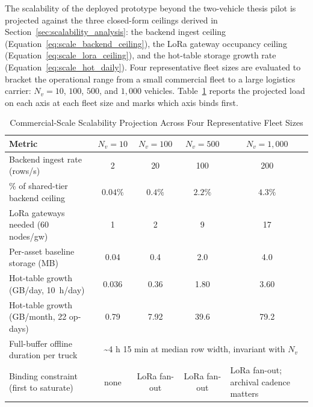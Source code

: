 The scalability of the deployed prototype beyond the two-vehicle thesis pilot is projected against the three closed-form ceilings derived in Section~\ref{sec:scalability_analysis}: the backend ingest ceiling (Equation~\ref{eq:scale_backend_ceiling}), the LoRa gateway occupancy ceiling (Equation~\ref{eq:scale_lora_ceiling}), and the hot-table storage growth rate (Equation~\ref{eq:scale_hot_daily}). Four representative fleet sizes are evaluated to bracket the operational range from a small commercial fleet to a large logistics carrier: $N_v = 10$, $100$, $500$, and $1{,}000$ vehicles. Table~\ref{tab:commercial_scalability} reports the projected load on each axis at each fleet size and marks which axis binds first.

\begin{table}[!htbp]
\centering
\caption{Commercial-Scale Scalability Projection Across Four Representative Fleet Sizes}
\label{tab:commercial_scalability}
\scriptsize
\setlength{\tabcolsep}{3pt}
\renewcommand{\arraystretch}{1.15}
\begin{tabular}{|p{}|c|c|c|p{}|}
\hline
\textbf{Metric} & \textbf{$N_v = 10$} & \textbf{$N_v = 100$} & \textbf{$N_v = 500$} & \multicolumn{1}{c|}{\textbf{$N_v = 1{,}000$}} \\
\hline
Backend ingest rate (rows/s) & 2 & 20 & 100 & \multicolumn{1}{c|}{200} \\
\hline
\% of shared-tier backend ceiling & $0.04\%$ & $0.4\%$ & $2.2\%$ & \multicolumn{1}{c|}{$4.3\%$} \\
\hline
LoRa gateways needed (60 nodes/gw) & 1 & 2 & 9 & \multicolumn{1}{c|}{17} \\
\hline
Per-asset baseline storage (MB) & 0.04 & 0.4 & 2.0 & \multicolumn{1}{c|}{4.0} \\
\hline
Hot-table growth (GB/day, 10~h/day) & 0.036 & 0.36 & 1.80 & \multicolumn{1}{c|}{3.60} \\
\hline
Hot-table growth (GB/month, 22 op-days) & 0.79 & 7.92 & 39.6 & \multicolumn{1}{c|}{79.2} \\
\hline
Full-buffer offline duration per truck & \multicolumn{4}{c|}{\textasciitilde{}4 h 15 min at median row width, invariant with $N_v$} \\
\hline
Binding constraint (first to saturate) & none & LoRa fan-out & LoRa fan-out & LoRa fan-out; archival cadence matters \\
\hline
\end{tabular}
\end{table}

